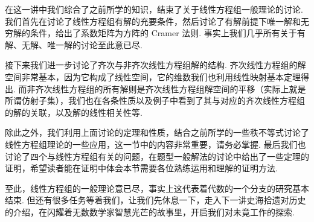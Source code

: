 \begin{summary}

    在这一讲中我们综合了之前所学的知识，结束了关于线性方程组一般理论的讨论. 我们首先在讨论了线性方程组有解的充要条件，然后讨论了有解前提下唯一解和无穷解的条件，给出了系数矩阵为方阵的 Cramer 法则. 事实上我们几乎所有关于有解、无解、唯一解的讨论至此意已尽.

    接下来我们进一步讨论了齐次与非齐次线性方程组解的结构. 齐次线性方程组的解空间非常基本，因为它构成了线性空间，它的维数我们也利用线性映射基本定理得出. 而非齐次线性方程组的所有解则是齐次线性方程组解空间的平移（实际上就是所谓仿射子集），我们也在各条性质以及例子中看到了其与对应的齐次线性方程组的解的关联，以及解的线性相关性等.

    除此之外，我们利用上面讨论的定理和性质，结合之前所学的一些秩不等式讨论了线性方程组理论的一些应用，这一节中的内容非常重要，请务必掌握. 最后我们也讨论了四个与线性方程组有关的问题，在题型一般解法的讨论中给出了一些定理的证明，希望读者能在证明中体会本节需要各位熟练运用和理解的证明方法.

    至此，线性方程组的一般理论意已尽，事实上这代表着代数的一个分支的研究基本结束. 但还有很多任务等着我们，让我们先休息一下，走入下一讲史海拾遗对历史的介绍，在闪耀着无数数学家智慧光芒的故事里，开启我们对未竟工作的探索.

\end{summary}

